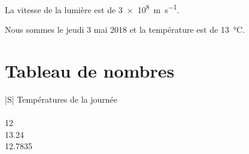 		La vitesse de la lumière est de \SI{3e8}{\m\per\second}.
		
		Nous sommes le jeudi 3 mai 2018 et la température est de \SI{13}{\celsius}.
		
	\section{Tableau de nombres}
	
		\begin{tabular}{|S|}
			\hline
			{Températures de la journée} \\
			 \\
			12 \\
			13.24 \\
			12.7835 \\
			\hline
		\end{tabular}